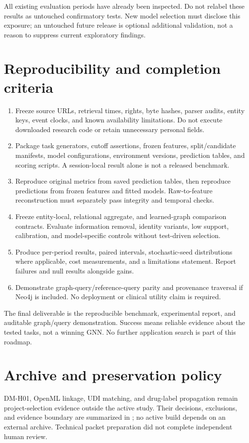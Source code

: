 \documentclass[11pt,a4paper]{article}
\begin{document}
All existing evaluation periods have already been inspected. Do not relabel these results as untouched confirmatory tests. New model selection must disclose this exposure; an untouched future release is optional additional validation, not a reason to suppress current exploratory findings.

\section{Reproducibility and completion criteria}
\begin{enumerate}
\item Freeze source URLs, retrieval times, rights, byte hashes, parser audits, entity keys, event clocks, and known availability limitations. Do not execute downloaded research code or retain unnecessary personal fields.
\item Package task generators, cutoff assertions, frozen features, split/candidate manifests, model configurations, environment versions, prediction tables, and scoring scripts. A session-local result alone is not a released benchmark.
\item Reproduce original metrics from saved prediction tables, then reproduce predictions from frozen features and fitted models. Raw-to-feature reconstruction must separately pass integrity and temporal checks.
\item Freeze entity-local, relational aggregate, and learned-graph comparison contracts. Evaluate information removal, identity variants, low support, calibration, and model-specific controls without test-driven selection.
\item Produce per-period results, paired intervals, stochastic-seed distributions where applicable, cost measurements, and a limitations statement. Report failures and null results alongside gains.
\item Demonstrate graph-query/reference-query parity and provenance traversal if Neo4j is included. No deployment or clinical utility claim is required.
\end{enumerate}
The final deliverable is the reproducible benchmark, experimental report, and auditable graph/query demonstration. Success means reliable evidence about the tested tasks, not a winning GNN. No further application search is part of this roadmap.

\section{Archive and preservation policy}
DM-H01, OpenML linkage, UDI matching, and drug-label propagation remain project-selection evidence outside the active study. Their decisions, exclusions, and evidence boundary are summarized in ; no active build depends on an external archive. Technical packet preparation did not complete independent human review.
\end{document}
